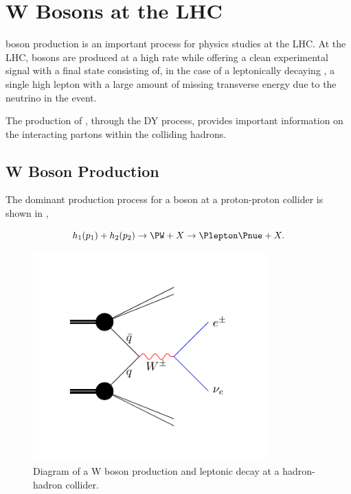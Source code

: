 \chapter[W Bosons]{W Bosons at the LHC}
\label{chap:wboson}

\PW boson production is an important process for physics studies at the LHC.  At
the \ac{LHC}, \PW bosons are produced at a high rate while offering a clean
experimental signal with a final state consisting of, in the case of a
leptonically decaying \PW, a single high \PT lepton with a large amount of
missing transverse energy due to the neutrino in the event. 

The production of \PW, through the \ac{DY} process, provides important
information on the interacting partons within the colliding hadrons.

\section{W Boson Production}

The dominant production process for a \PW boson at a proton-proton collider is
shown in ,

\begin{equation}
  h_1(p_1) + h_2(p_2)
  \to 
  \PW + X
  \to
  \Plepton \Pnue + X.
  \label{wbos:wprod}
\end{equation}

\begin{figure}[htbp]
  \centering
  \includegraphics[width=0.8\textwidth]{w_production}
  \caption{Diagram of a W boson production and leptonic decay at a hadron-hadron collider.}
  \label{wbos:wproddiag}
\end{figure}

